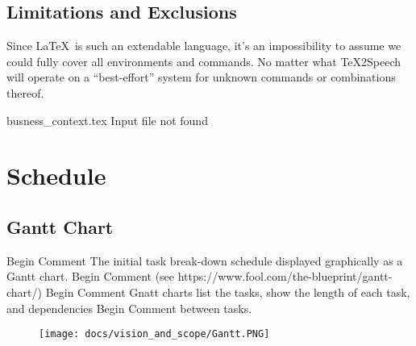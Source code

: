                                                                                                                                                                                                                                                                                                                                                                                                                                                                                                                                                                                                                                                                                                                                                                                                                                                                                                                                                                                                                                                                                                                                                                                                                                                                                                                                                                                                                                                                                                                                                                                                                                                                                                                                                                                                                                                                                                                                                                                                                                                                                                                                                                                                                                                                                                                                                                                                                                                                                                                                                                                                                                                                                                                                                                                                                                                                                                                                                                                                                                                                                                                                                                                                                                                                                                                                                                                                                                                                                                                                                                                                                                                                                                                                                                                                                                                                                                                                                                                                                                                                                                                                                                                                                                                                                                                                                                                                                                                                                                                                                                                                                                                                                                                                                                                                                                                                                                                                                                                                                                                                                                                                                                                                                                                                                                                                                                                                                                                                                                                                                                                                                                                                                                                                                                                                                                                                                                                                                                                                                                                                                                                                                                                                                                                                                                                                                                                                                                                                                                                                                                                                                                                                                                                                                                                                                                                                                                                                                                                                                                                                                                                                                                                                                                                                                                                                                                                                                                                                                                                                                                                                                                                                                                                                                                                                                                                                                                                                                                                                                                                                                                                                                                                                                                                                                                                                                                                                                                                                                                                                                                                                                                                                                                                                                                                                                                                                                                                                                                                                                                                                                                                                                                                                                                                                                                                                                                                                                                                                                                                                                                                                                                                                                                                                                                                                                                                                                                                                                                                                                                                                                                                                                                                                                                                                                                                                                                                                                                                                                                                                                                                                                                                                                                                                                                                                                                                                                                                                                                                                                                                                                                                                                                                                                                                                                                                                                                                                                                                                                                                                                                                                                            \documentclass[letterpaper,12pt]{article}
\begin{document}
\subsection{Limitations and Exclusions}
Since \LaTeX\ is such an extendable language, it’s an impossibility to assume we could fully cover all environments and commands. No matter what \TeX 2Speech will operate on a “best-effort” system for unknown commands or combinations thereof.

busness_context.tex Input file not found 

\section{Schedule}

\subsection{Gantt Chart}
Begin Comment  The initial task break-down schedule displayed graphically as a Gantt chart.
Begin Comment  (see https://www.fool.com/the-blueprint/gantt-chart/)
Begin Comment  Gnatt charts list the tasks, show the length of each task, and dependencies
Begin Comment  between tasks.  
\begin{figure}[h]
\texttt{[image: docs/vision\_and\_scope/Gantt.PNG]}
\end{figure}
\end{document}
